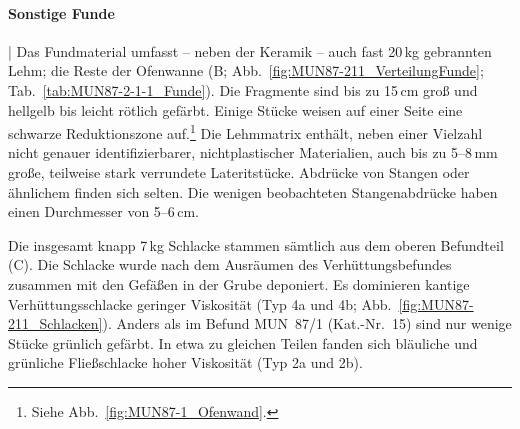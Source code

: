 \paragraph{Sonstige Funde}\hspace{-.5em}|\hspace{.5em}%
Das Fundmaterial umfasst -- neben der Keramik -- auch fast 20\,kg gebrannten Lehm; die Reste der Ofenwanne (B; Abb.~\ref{fig:MUN87-211_VerteilungFunde}; Tab.~\ref{tab:MUN87-2-1-1_Funde}). Die Fragmente sind bis zu 15\,cm groß und hellgelb bis leicht rötlich gefärbt. Einige Stücke weisen auf einer Seite eine schwarze Reduktionszone auf.\footnote{Siehe Abb.~\ref{fig:MUN87-1_Ofenwand}.} Die Lehmmatrix enthält, neben einer Vielzahl nicht genauer identifizierbarer, nichtplastischer Materialien, auch bis zu 5--8\,mm große, teilweise stark verrundete Lateritstücke. Abdrücke von Stangen oder ähnlichem finden sich selten. Die wenigen beobachteten Stangenabdrücke haben einen Durchmesser von 5--6\,cm.

Die insgesamt knapp 7\,kg Schlacke stammen sämtlich aus dem oberen Befundteil (C). Die Schlacke wurde nach dem Ausräumen des Verhüttungsbefundes zusammen mit den Gefäßen in der Grube deponiert. Es dominieren kantige Verhüttungsschlacke geringer Viskosität (Typ 4a und 4b; Abb.~\ref{fig:MUN87-211_Schlacken}). Anders als im Befund MUN~87/1 (Kat.-Nr.~15) sind nur wenige Stücke grünlich gefärbt. In etwa zu gleichen Teilen fanden sich bläuliche und grünliche Fließschlacke hoher Viskosität (Typ 2a und 2b).

